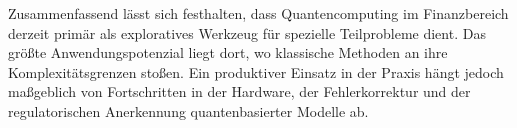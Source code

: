 Zusammenfassend lässt sich festhalten, dass Quantencomputing im Finanzbereich derzeit primär als exploratives Werkzeug für spezielle Teilprobleme dient. Das größte Anwendungspotenzial liegt dort, wo klassische Methoden an ihre Komplexitätsgrenzen stoßen. Ein produktiver Einsatz in der Praxis hängt jedoch maßgeblich von Fortschritten in der Hardware, der Fehlerkorrektur und der regulatorischen Anerkennung quantenbasierter Modelle ab.





\printbibliography






